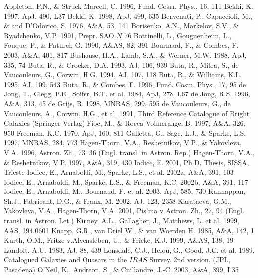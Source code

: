 \documentclass[]{aa}
\begin{document}
\begin{thebibliography}{}
\bibitem{} Appleton, P.N., \& Struck-Marcell, C. 1996,
Fund. Cosm. Phys., 16, 111
\bibitem{} Bekki, K. 1997, ApJ, 490, L37
\bibitem{} Bekki, K. 1998, ApJ, 499, 635
\bibitem{} Benvenuti, P., Capaccioli, M., \& and D'Odorico, S. 1976,
A\&A, 53, 141
\bibitem{} Borisenko, A.N., Markelov, S.V., \& Ryadchenko, V.P. 1991,
Prepr. SAO $N$ 76
\bibitem{} Bottinelli, L., Gouguenheim, L., Fouque, P., \& Paturel, G.
1990, A\&AS, 82, 391
\bibitem{} Bournaud, F., \& Combes, F. 2003, A\&A, 401, 817
\bibitem{} Bushouse, H.A., Lamb, S.A., \& Werner, M.W. 1988,
ApJ, 335, 74
\bibitem{} Buta, R., \& Crocker, D.A. 1993, AJ, 106, 939
\bibitem{} Buta, R., Mitra, S., de Vaucouleurs, G., Corwin, H.G. 1994,
AJ, 107, 118
\bibitem{} Buta, R., \& Williams, K.L. 1995, AJ, 109, 543
\bibitem{} Buta, R., \& Combes, F. 1996, Fund. Cosm. Phys., 17, 95
\bibitem{} de Jong, T., Clegg, P.E., Soifer, B.T. et al. 1984,
ApJ, 278, L67
\bibitem{} de Jong, R.S. 1996, A\&A, 313, 45
\bibitem{} de Grijs, R. 1998, MNRAS, 299, 595
\bibitem{} de Vaucouleurs, G., de Vaucouleurs, A., Corwin, H.G., et al.
1991, Third Reference Catalogue of Bright Galaxies (Springer-Verlag)
\bibitem{} Fioc, M., \& Rocca-Volmerange, B. 1997, A\&A, 326, 950
\bibitem{} Freeman, K.C. 1970, ApJ, 160, 811
\bibitem{} Galletta, G., Sage, L.J., \& Sparke, L.S. 1997,
MNRAS, 284, 773
\bibitem{} Hagen-Thorn, V.A., Reshetnikov, V.P., \& Yakovleva, V.A. 
1996, Astron. Zh., 73, 36 (Engl. transl. in Astron. Rep.)
\bibitem{} Hagen-Thorn, V.A., \& Reshetnikov, V.P. 1997, A\&A, 319, 430
\bibitem{} Iodice, E. 2001, Ph.D. Thesis, SISSA, Trieste
\bibitem{} Iodice, E., Arnaboldi, M., Sparke, L.S., et al. 2002a,
A\&A, 391, 103
\bibitem{} Iodice, E., Arnaboldi, M., Sparke, L.S., \& Freeman, K.C. 
2002b, A\&A, 391, 117
\bibitem{} Iodice, E., Arnaboldi, M., Bournaud, F. et al. 2003,
ApJ, 585, 730
\bibitem{} Kannappan, Sh.J., Fabricant, D.G., \& Franx, M. 2002,
AJ, 123, 2358
\bibitem{} Karataeva, G.M., Yakovleva, V.A., Hagen-Thorn, V.A. 2001,
Pis'ma v Astron. Zh., 27, 94 (Engl. transl. in Astron. Let.)
\bibitem{} Kinney, A.L., Gallagher, J., Matthews, L. et al. 1999,
AAS, 194.0601
\bibitem{} Knapp, G.R., van Driel W., \& van Woerden H. 1985,
A\&A, 142, 1
\bibitem{} Kurth, O.M., Fritze-v.Alvensleben, U., \& Fricke, K.J. 1999,
A\&AS, 138, 19
\bibitem{} Landolt, A.U. 1983, AJ, 88, 439
\bibitem{} Lonsdale, C.J., Helou, G., Good, J.C. et al. 1989,
Catalogued Galaxies and Quasars in the $IRAS$ Survey, 2nd version,
(JPL, Pasadena)
\bibitem{} O'Neil, K., Andreon, S., \& Cuillandre, J.-C. 2003,
A\&A, 399, L35

\end{thebibliography}
\end{document}

